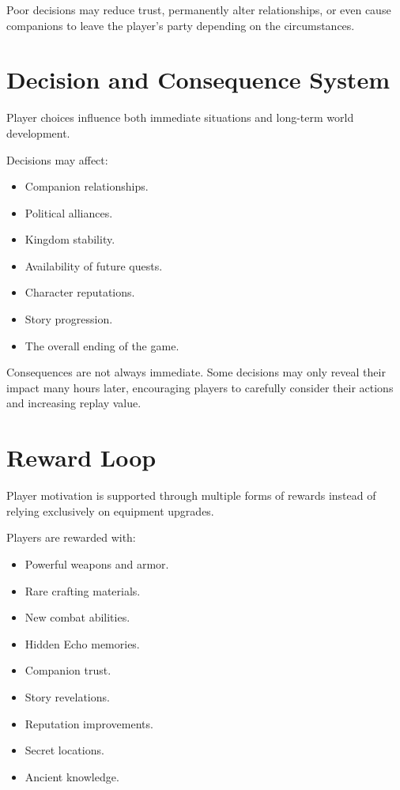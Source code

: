 Poor decisions may reduce trust, permanently alter relationships, or even cause companions to leave the player's party depending on the circumstances.

\section{Decision and Consequence System}

Player choices influence both immediate situations and long-term world development.

Decisions may affect:

\begin{itemize}
    \item Companion relationships.
    \item Political alliances.
    \item Kingdom stability.
    \item Availability of future quests.
    \item Character reputations.
    \item Story progression.
    \item The overall ending of the game.
\end{itemize}

Consequences are not always immediate. Some decisions may only reveal their impact many hours later, encouraging players to carefully consider their actions and increasing replay value.

\section{Reward Loop}

Player motivation is supported through multiple forms of rewards instead of relying exclusively on equipment upgrades.

Players are rewarded with:

\begin{itemize}
    \item Powerful weapons and armor.
    \item Rare crafting materials.
    \item New combat abilities.
    \item Hidden Echo memories.
    \item Companion trust.
    \item Story revelations.
    \item Reputation improvements.
    \item Secret locations.
    \item Ancient knowledge.
\end{itemize}

